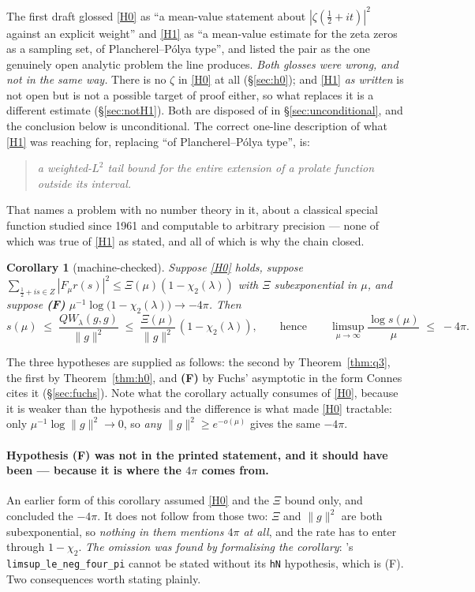 \documentclass[11pt,a4paper]{article}
\theoremstyle{plain}
\newtheorem{corollary}[theorem]{Corollary}
\theoremstyle{definition}
\theoremstyle{remark}
\newcommand{\R}{\mathbb{R}}
\newcommand{\Z}{\mathbb{Z}}
\newcommand{\Q}{\mathbb{Q}}
\newcommand{\A}{\mathbb{A}}
\newcommand{\E}{\mathcal{E}}
\newcommand{\F}{\mathcal{F}}
\newcommand{\QW}{QW}
\newcommand{\file}[1]{\path{#1}}
\def\QW{QW}\def\E{E}\def\F{F}\def\R{R}\def\Q{Q}\def\Z{Z}\def\A{A}%
\begin{document}
\noindent The first draft glossed \eqref{H0} as ``a mean-value statement about
$|\zeta(\tfrac12+it)|^2$ against an explicit weight'' and \eqref{H1} as ``a
mean-value estimate for the zeta zeros as a sampling set, of
Plancherel--P\'olya type'', and listed the pair as the one genuinely open
analytic problem the line produces.  \emph{Both glosses were wrong, and not in
the same way.}  There is no $\zeta$ in \eqref{H0} at all
(\S\ref{sec:h0}); and \eqref{H1} \emph{as written} is not open but is not a
possible target of proof either, so what replaces it is a different estimate
(\S\ref{sec:notH1}).  Both are disposed of in \S\ref{sec:unconditional}, and the
conclusion below is unconditional.  The correct one-line description of what
\eqref{H1} was reaching for, replacing ``of Plancherel--P\'olya type'', is:

\begin{quote}
\emph{a weighted-$L^2$ tail bound for the entire extension of a prolate function
outside its interval.}
\end{quote}

\noindent That names a problem with no number theory in it, about a classical
special function studied since 1961 and computable to arbitrary precision ---
none of which was true of \eqref{H1} as stated, and all of which is why the
chain closed.

\begin{corollary}[machine-checked]\label{cor:upper}
Suppose \eqref{H0} holds, suppose
$\sum_{\frac12+is\in Z}|\F_\mu r(s)|^2\le\Xi(\mu)(1-\chi_2(\lambda))$ with $\Xi$
subexponential in $\mu$, and suppose
\textbf{(F)} $\mu^{-1}\log\big(1-\chi_2(\lambda)\big)\to-4\pi$.  Then
\[
  s(\mu)\;\le\;\frac{\QW_\lambda(g,g)}{\|g\|^2}\;\le\;
  \frac{\Xi(\mu)}{\|g\|^2}\,(1-\chi_2(\lambda)),
  \qquad\text{hence}\qquad
  \limsup_{\mu\to\infty}\frac{\log s(\mu)}{\mu}\;\le\;-4\pi .
\]
\end{corollary}

The three hypotheses are supplied as follows: the second by
Theorem~\ref{thm:q3}, the first by Theorem~\ref{thm:h0}, and \textbf{(F)} by
Fuchs' asymptotic in the form Connes cites it (\S\ref{sec:fuchs}).  Note what the
corollary actually consumes of \eqref{H0}, because it is weaker than the
hypothesis and the difference is what made \eqref{H0} tractable: only
$\mu^{-1}\log\|g\|^2\to0$, so \emph{any} $\|g\|^2\ge e^{-o(\mu)}$ gives the same
$-4\pi$.

\paragraph{Hypothesis (F) was not in the printed statement, and it should have
been --- because it is where the $4\pi$ comes from.}  An earlier form of this
corollary assumed \eqref{H0} and the $\Xi$ bound only, and concluded the
$-4\pi$.  It does not follow from those two: $\Xi$ and $\|g\|^2$ are both
subexponential, so \emph{nothing in them mentions $4\pi$ at all}, and the rate
has to enter through $1-\chi_2$.  \emph{The omission was found by formalising the
corollary}: \file{lean/Riemann/Assembly.lean}'s
\texttt{limsup\_le\_neg\_four\_pi} cannot be stated without its \texttt{hN}
hypothesis, which is (F).  Two consequences worth stating plainly.
\end{document}
